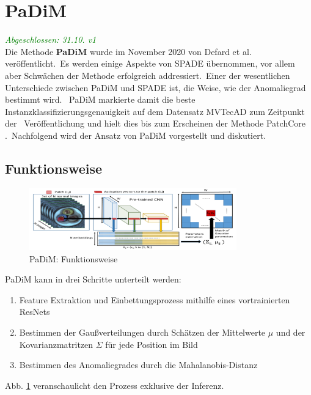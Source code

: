 \section{PaDiM}\label{sec:PaDiM}
\textcolor{green}{\textit{Abgeschlossen: 31.10. v1}}\\
Die Methode \textbf{PaDiM} wurde im November 2020 von Defard et al. veröffentlicht.\
Es werden einige Aspekte von SPADE übernommen, vor allem aber Schwächen der Methode erfolgreich addressiert.\ 
Einer der wesentlichen Unterschiede zwischen PaDiM und SPADE ist, die Weise, wie der Anomaliegrad bestimmt wird. \ 
PaDiM markierte damit die beste Instanzklassifizierungsgenauigkeit auf dem Datensatz MVTecAD zum Zeitpunkt der \ 
Veröffentlichung und hielt dies bis zum Erscheinen der Methode \glqq PatchCore\grqq{} \cite{paperswithcode}.\
Nachfolgend wird der Ansatz von PaDiM vorgestellt und diskutiert.\
\subsection{Funktionsweise}\label{subsec:PaDiMFunktionsweise}
\begin{figure}[H]
  \centering
  \includegraphics[width=0.8\textwidth]{bilder/padim.png}
  \caption{PaDiM: Funktionsweise \cite{padim}}
  \label{fig:PaDiMOverview}
\end{figure}
PaDiM kann in drei Schritte unterteilt werden:\
\begin{enumerate}
  \item Feature Extraktion und Einbettungsprozess mithilfe eines vortrainierten ResNets
  \item Bestimmen der Gaußverteilungen durch Schätzen der Mittelwerte $\mu$ und der Kovarianzmatritzen $\Sigma$ für jede Position im Bild
  \item Bestimmen des Anomaliegrades durch die Mahalanobis-Distanz
\end{enumerate}
Abb. \ref{fig:PaDiMOverview} veranschaulicht den Prozess exklusive der Inferenz. \
